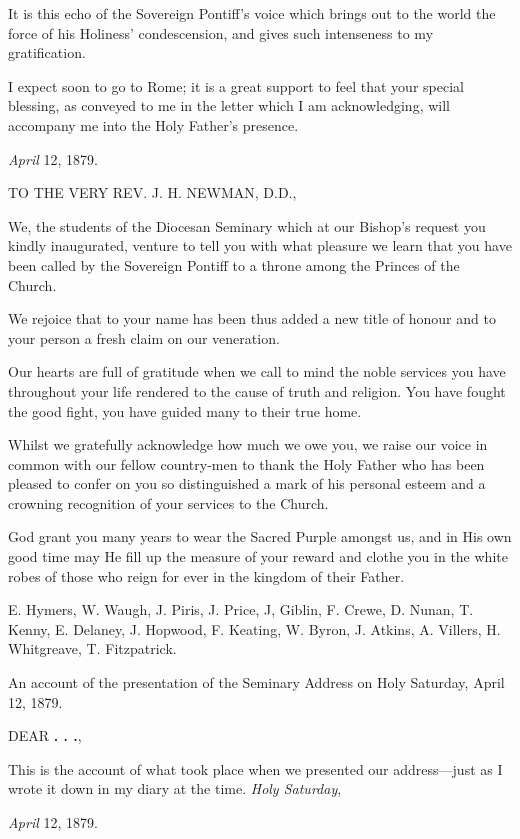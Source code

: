It is this echo of the Sovereign Pontiff's voice which brings out
to the world the force of his Holiness' condescension, and gives
such intenseness to my gratification.

I expect soon to go to Rome; it is a great support to feel that
your special blessing, as conveyed to me in the letter which I am
acknowledging, will accompany me into the Holy Father's presence.


\emph{April} 12, 1879.

TO THE VERY
REV. J. H. NEWMAN, D.D.,

We, the students of the Diocesan Seminary which at our Bishop's
request you kindly inaugurated, venture to tell you with what pleasure
we learn that you have been called by the Sovereign Pontiff to a
throne among the Princes of the Church.

We rejoice that to your name has been thus added a new title of
honour and to your person a fresh claim on our veneration.

Our hearts are full of gratitude when we call to mind the noble
services you have throughout your life rendered to the cause of truth
and religion. You have fought the good fight, you have guided many to
their true home.

Whilst we gratefully acknowledge how much we owe you, we raise
our voice in common with our fellow country-men to thank the Holy
Father who has been pleased to confer on you so distinguished a mark
of his personal esteem and a crowning recognition of your services to
the Church.

God grant you many years to wear the Sacred Purple amongst us, and
in His own good time may He fill up the measure of your reward and
clothe you in the white robes of those who reign for ever in the
kingdom of their Father.

E. Hymers, W. Waugh, J. Piris, J. Price, J, Giblin, F. Crewe, D.
Nunan, T. Kenny, E. Delaney, J. Hopwood, F. Keating, W. Byron, J.
Atkins, A. Villers, H. Whitgreave, T. Fitzpatrick.

An account of the presentation of the Seminary
Address on Holy Saturday, April 12, 1879.

DEAR \textbf{. . .},

This is the account of what took place when we presented our address—just
as I wrote it down in my diary at the time.
\emph{Holy Saturday},

\emph{April} 12, 1879.


